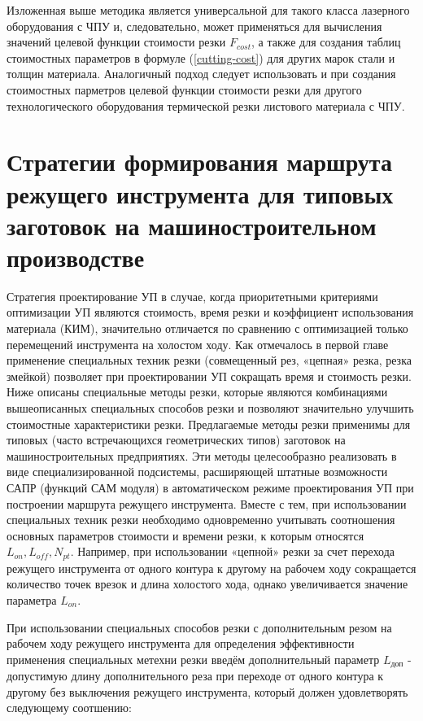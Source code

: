 \documentclass[12pt]{report}
\begin{document}
Изложенная выше методика является универсальной
для такого класса лазерного оборудования с ЧПУ и,
следовательно, может применяться для вычисления значений
целевой функции стоимости резки
$F_{cost}$,
а также для создания таблиц стоимостных параметров в формуле (\ref{cutting-cost})
для других марок стали и толщин материала.
Аналогичный подход следует использовать и при создания
стоимостных парметров целевой функции стоимости резки
для другого технологического оборудования термической
резки листового материала с ЧПУ.

\section{Стратегии формирования маршрута режущего инструмента для типовых заготовок на машиностроительном производстве}

Стратегия проектирование УП в случае,
когда приоритетными критериями оптимизации УП являются стоимость,
время резки и коэффициент использования материала (КИМ),
значительно отличается по сравнению с оптимизацией
только перемещений инструмента на холостом ходу.
Как отмечалось в первой главе применение специальных техник резки
(совмещенный рез, «цепная» резка, резка змейкой)
позволяет при проектировании УП сокращать время и стоимость резки.
Ниже описаны специальные методы резки,
которые являются комбинациями вышеописанных специальных способов резки
и позволяют значительно улучшить стоимостные характеристики резки.
Предлагаемые методы резки применимы для типовых
(часто встречающихся геометрических типов)
заготовок на машиностроительных предприятиях.
Эти методы целесообразно реализовать в
виде специализированной подсистемы,
расширяющей штатные возможности САПР (функций САМ модуля)
в автоматическом режиме проектирования УП при построении
маршрута режущего инструмента.
Вместе с тем, при использовании специальных техник
резки необходимо одновременно учитывать соотношения
основных параметров стоимости и времени резки,
к которым относятся
$L_{on}, L_{off}, N_{pt}$.
Например, при использовании «цепной» резки
за счет перехода режущего инструмента от одного
контура к другому на рабочем ходу сокращается
количество точек врезок и длина холостого хода,
однако увеличивается значение параметра
$L_{on}$.

При использовании специальных способов резки
с дополнительным резом на рабочем ходу режущего инструмента
для определения эффективности применения специальных
метехни резки введём дополнительный параметр
$L_\text{доп}$ - допустимую длину дополнительного реза
при переходе от одного контура к другому
без выключения режущего инструмента,
который должен удовлетворять следующему соотшению:
\end{document}
